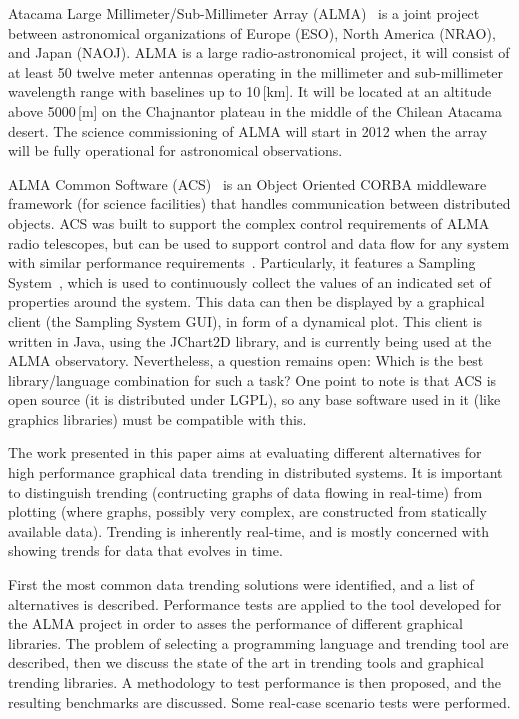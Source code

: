 Atacama Large Millimeter/Sub-Millimeter Array (ALMA)~\cite{2010AAS...21547901H}
is a joint project between astronomical organizations of Europe (ESO), North
America (NRAO), and Japan (NAOJ). ALMA is a large radio-astronomical project,
it will consist of at least 50 twelve meter antennas operating in the
millimeter and sub-millimeter wavelength range with baselines up to 10\,[km].
It will be located at an altitude above 5000\,[m] on the Chajnantor plateau in
the middle of the Chilean Atacama desert. The science commissioning of ALMA
will start in 2012 when the array will be fully operational for astronomical
observations.

ALMA Common Software
(ACS)~\cite{Chiozzi02,Chiozzi04,Raffi01,chiozzi09:_acs_status} is an Object
Oriented CORBA middleware framework (for science facilities) that
handles communication between distributed objects.  ACS was built to support
the complex control requirements of ALMA radio telescopes, but can be used to
support control and data flow for any system with similar performance
requirements~\cite{gchiozzi02}.
Particularly, it features a Sampling System~\cite{acssamp}, which is used to
continuously collect the values of an indicated set of properties around the
system. This data can then be displayed by a graphical client (the Sampling
System GUI), in form of a
dynamical plot. This client is written in Java, using the JChart2D library, and
is currently being used at the ALMA observatory. Nevertheless, a question
remains open: Which is the best library/language combination for such a
task?
One point to note is that ACS is open source
(it is distributed under LGPL),
so any base software used in it
(like graphics libraries)
must be compatible with this.

The work presented in this paper
aims at evaluating different alternatives for high performance
graphical data trending in
distributed systems.%
It is important to distinguish trending
(contructing graphs of data flowing in real-time)
from plotting
(where graphs,
 possibly very complex,
 are constructed from statically available data).
Trending is inherently real-time,
and is mostly concerned with showing trends for data that evolves in time.

First the most common  data trending solutions were identified, and a list of
alternatives is described. Performance tests are applied to the tool
developed for the ALMA project in order to asses the
performance of different graphical libraries.
The problem of selecting a programming language and trending tool
are described,
then we discuss the state of the art
in trending tools and graphical trending libraries.
A methodology to test performance is then proposed,
and the resulting benchmarks are discussed.
Some real-case scenario tests were performed.

